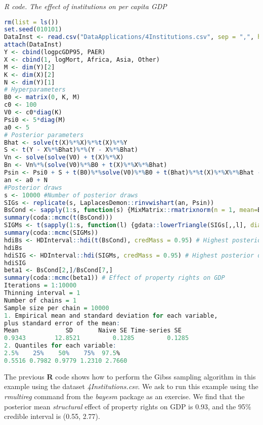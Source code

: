 \begin{tcolorbox}[enhanced,width=4.67in,center upper,
	fontupper=\large\bfseries,drop shadow southwest,sharp corners]
	\textit{R code. The effect of institutions on per capita GDP}
	\begin{VF}
		\begin{lstlisting}[language=R]
rm(list = ls())
set.seed(010101)
DataInst <- read.csv("DataApplications/4Institutions.csv", sep = ",", header = TRUE, fileEncoding = "latin1")
attach(DataInst)
Y <- cbind(logpcGDP95, PAER)
X <- cbind(1, logMort, Africa, Asia, Other)
M <- dim(Y)[2]
K <- dim(X)[2]
N <- dim(Y)[1]
# Hyperparameters
B0 <- matrix(0, K, M)
c0 <- 100
V0 <- c0*diag(K)
Psi0 <- 5*diag(M)
a0 <- 5
# Posterior parameters
Bhat <- solve(t(X)%*%X)%*%t(X)%*%Y 
S <- t(Y - X%*%Bhat)%*%(Y - X%*%Bhat)
Vn <- solve(solve(V0) + t(X)%*%X) 
Bn <- Vn%*%(solve(V0)%*%B0 + t(X)%*%X%*%Bhat)
Psin <- Psi0 + S + t(B0)%*%solve(V0)%*%B0 + t(Bhat)%*%t(X)%*%X%*%Bhat - t(Bn)%*%solve(Vn)%*%Bn
an <- a0 + N
#Posterior draws
s <- 10000 #Number of posterior draws
SIGs <- replicate(s, LaplacesDemon::rinvwishart(an, Psin))
BsCond <- sapply(1:s, function(s) {MixMatrix::rmatrixnorm(n = 1, mean=Bn, U = Vn,V = SIGs[,,s])})
summary(coda::mcmc(t(BsCond)))
SIGMs <- t(sapply(1:s, function(l) {gdata::lowerTriangle(SIGs[,,l], diag=TRUE, byrow=FALSE)}))
summary(coda::mcmc(SIGMs))
hdiBs <- HDInterval::hdi(t(BsCond), credMass = 0.95) # Highest posterior density credible interval
hdiBs
hdiSIG <- HDInterval::hdi(SIGMs, credMass = 0.95) # Highest posterior density credible interval
hdiSIG
beta1 <- BsCond[2,]/BsCond[7,] 
summary(coda::mcmc(beta1)) # Effect of property rights on GDP
Iterations = 1:10000
Thinning interval = 1 
Number of chains = 1 
Sample size per chain = 10000 
1. Empirical mean and standard deviation for each variable,
plus standard error of the mean:
Mean             SD       Naive SE Time-series SE 
0.9343        12.8521         0.1285         0.1285 
2. Quantiles for each variable:
2.5%    25%    50%    75%  97.5% 
0.5516 0.7982 0.9779 1.2310 2.7660
\end{lstlisting}
	\end{VF}
\end{tcolorbox} 
 
The previous \textbf{R} code shows how to perform the Gibss sampling algorithm in this example using the dataset \textit{4Institutions.csv}. We ask to run this example using the \textit{rmultireg} command from the \textit{bayesm} package as an exercise. We find that the posterior mean \textit{structural} effect of property rights on GDP is 0.93, and the 95\% credible interval is (0.55, 2.77). 

